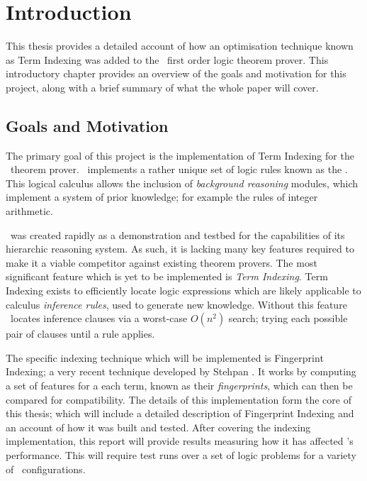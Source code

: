 
\chapter{Introduction}
\label{cha:intro}

This thesis provides a detailed account of how an optimisation technique known
as Term Indexing was added to the \beagle\ first order logic theorem prover. This
introductory chapter provides an overview of the goals and motivation for this project,
along with a brief summary of what the whole paper will cover.

\section{Goals and Motivation}
\label{sec:mot}

The primary goal of this project is the implementation of Term Indexing
for the \beagle\ theorem prover. \Beagle\ implements a rather unique set of logic rules known as the \emph{\HSWAC} \cite{baum13}.
This logical calculus allows the inclusion of \emph{background reasoning} modules,
which implement a system of prior knowledge; for example the rules of integer arithmetic.

\Beagle\ was created rapidly as a demonstration and testbed for the capabilities
of its hierarchic reasoning system. As such, it is lacking many key features required
to make it a viable competitor against existing theorem provers. The most significant
feature which is yet to be implemented is \emph{Term Indexing}. Term Indexing exists
to efficiently locate logic expressions which are likely applicable to calculus \emph{inference rules},
used to generate new knowledge. Without this feature \beagle\ locates inference clauses
via a worst-case $O(n^2)$ search; trying each possible pair of clauses until a rule applies.

The specific indexing technique which will be implemented is Fingerprint Indexing;
a very recent technique developed by Stehpan . It works by computing
a set of features for a each term, known as their \emph{fingerprints}, which can then
be compared for compatibility. The details of this implementation form the core
of this thesis; which will include a detailed description of Fingerprint Indexing
and an account of how it was built and tested.
After covering the indexing implementation, this report will provide results measuring
how it has affected \beagle's performance. This will require test runs over a set
of logic problems for a variety of \beagle\ configurations.

